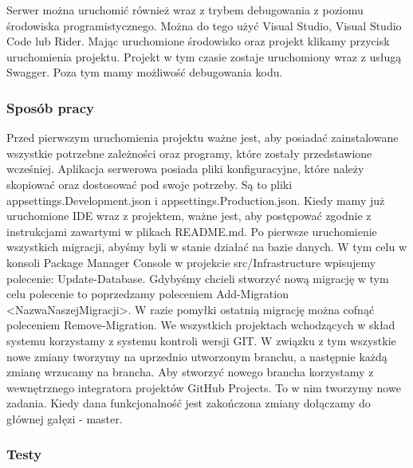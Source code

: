 \documentclass[a4paper,twoside,12pt]{book}
\begin{document}
Serwer można uruchomić również wraz z trybem debugowania z poziomu środowiska programistycznego. Można do tego użyć Visual Studio, Visual Studio Code lub Rider. Mając uruchomione środowisko oraz projekt klikamy przycisk uruchomienia projektu. Projekt w tym czasie zostaje uruchomiony wraz z usługą Swagger. Poza tym mamy możliwość debugowania kodu. 

\subsubsection{Sposób pracy}
Przed pierwszym uruchomienia projektu ważne jest, aby posiadać zainstalowane wszystkie potrzebne zależności oraz programy, które zostały przedstawione wcześniej. Aplikacja serwerowa posiada pliki konfiguracyjne, które należy skopiować oraz dostosować pod swoje potrzeby. Są to pliki appsettings.Development.json i appsettings.Production.json. Kiedy mamy już uruchomione IDE wraz z projektem, ważne jest, aby postępować zgodnie z instrukcjami zawartymi w plikach README.md. Po pierwsze uruchomienie wszystkich migracji, abyśmy byli w stanie działać na bazie danych. W tym celu w konsoli Package Manager Console w projekcie src/Infrastructure wpisujemy polecenie: Update-Database. Gdybyśmy chcieli stworzyć nową migrację w tym celu polecenie to poprzedzamy poleceniem Add-Migration <NazwaNaszejMigracji>. W razie pomyłki ostatnią migrację można cofnąć poleceniem Remove-Migration. We wszystkich projektach wchodzących w skład systemu korzystamy z systemu kontroli wersji GIT. W związku z tym wszystkie nowe zmiany tworzymy na uprzednio utworzonym branchu, a następnie każdą zmianę wrzucamy na brancha. Aby stworzyć nowego brancha korzystamy z wewnętrznego integratora projektów GitHub Projects. To w nim tworzymy nowe zadania. Kiedy dana funkcjonalność jest zakończona zmiany dołączamy do głównej gałęzi - master. 

\subsubsection{Testy}

\end{document}
